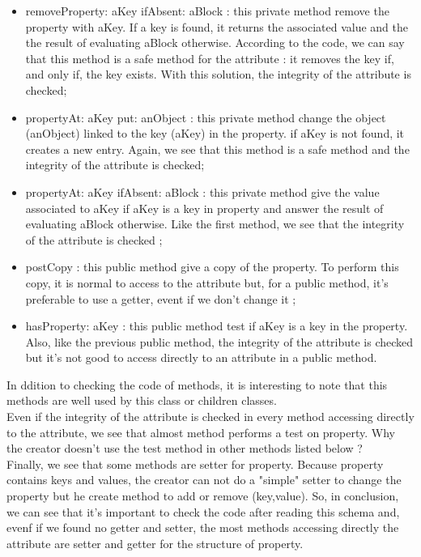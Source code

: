 \begin{itemize}
	\item removeProperty: aKey ifAbsent: aBlock : this private method 	remove the property with aKey.  If a key is found, it returns the associated value and the the result of evaluating aBlock otherwise.  According to the code, we can say that this method is a safe method for the attribute : it removes the key if, and only if, the key exists.  With this solution, the integrity of the attribute is checked;
	\item propertyAt: aKey put: anObject : this private method change the object (anObject) linked to the key (aKey) in the property.  if aKey is not found, it creates a new entry.  Again, we see that this method is a safe method and the integrity of the attribute is checked;
	\item propertyAt: aKey ifAbsent: aBlock : this private method give the value associated to aKey if aKey is a key in property and answer the result of evaluating aBlock otherwise.  Like the first method, we see that the integrity of the attribute is checked ;
	\item postCopy : this public method give a copy of the property.  To perform this copy, it is normal to access to the attribute but, for a public method, it's preferable to use a getter, event if we don't change it ;
	\item hasProperty: aKey : this public method test if aKey is a key in the property.  Also, like the previous public method, the integrity of the attribute is checked but it's not good to access directly to an attribute in a public method.
\end{itemize}
In ddition to checking the code of methods, it is interesting to note that this methods are well used by this class or children classes.\\
Even if the integrity of the attribute is checked in every method accessing directly to the attribute, we see that almost method performs a test on property.  Why the creator doesn't use the test method in other methods listed below ? \\
Finally, we see that some methods are setter for property.  Because property contains keys and values, the creator can not do a "simple" setter to change the property but he create method to add or remove (key,value).  So, in conclusion, we can see that it's important to check the code after reading this schema and, evenf if we found no getter and setter, the most methods accessing directly the attribute are setter and getter for the structure of property.







